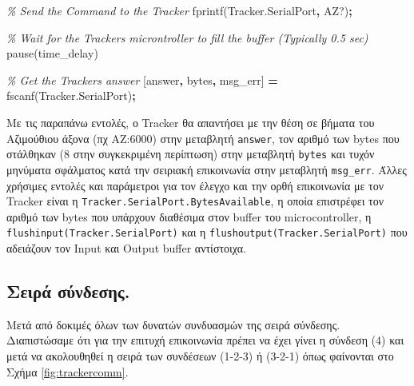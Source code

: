 \documentclass[
  a4paper,
  twoside,
  titlepage,
  12pt]{article}
\newenvironment{Shaded}{\begin{snugshade}}{\end{snugshade}}
\newcommand{\CommentTok}[1]{\textcolor[rgb]{0.56,0.35,0.01}{\textit{#1}}}
\newcommand{\NormalTok}[1]{#1}
\newcommand{\OperatorTok}[1]{\textcolor[rgb]{0.81,0.36,0.00}{\textbf{#1}}}
\newcommand{\SpecialStringTok}[1]{\textcolor[rgb]{0.31,0.60,0.02}{#1}}
\newcommand{\VariableTok}[1]{\textcolor[rgb]{0.00,0.00,0.00}{#1}}
\numberwithin{equation}{section}
\numberwithin{figure}{section}
\numberwithin{table}{section}
\begin{document}
\begin{Shaded}
\begin{Highlighting}[]
\CommentTok{\% Send the Command to the Tracker}
\VariableTok{fprintf}\NormalTok{(}\VariableTok{Tracker}\NormalTok{.}\VariableTok{SerialPort}\OperatorTok{,} \SpecialStringTok{\textquotesingle{}AZ?\textquotesingle{}}\NormalTok{)}\OperatorTok{;}
\end{Highlighting}
\end{Shaded}

\begin{Shaded}
\begin{Highlighting}[]
\CommentTok{\% Wait for the Tracker\textquotesingle{}s microntroller to fill the buffer (Typically 0.5 sec)}
\VariableTok{pause}\NormalTok{(}\VariableTok{time\_delay}\NormalTok{)}
\end{Highlighting}
\end{Shaded}

\begin{Shaded}
\begin{Highlighting}[]
\CommentTok{\% Get the Tracker\textquotesingle{}s answer}
\NormalTok{[}\VariableTok{answer}\OperatorTok{,} \VariableTok{bytes}\OperatorTok{,} \VariableTok{msg\_err}\NormalTok{] }\OperatorTok{=} \VariableTok{fscanf}\NormalTok{(}\VariableTok{Tracker}\NormalTok{.}\VariableTok{SerialPort}\NormalTok{)}\OperatorTok{;}
\end{Highlighting}
\end{Shaded}

Με τις παραπάνω εντολές, ο Tracker θα απαντήσει με την θέση σε βήματα του Αζιμούθιου άξονα (πχ AZ:6000) στην μεταβλητή \texttt{answer}, τον αριθμό των bytes που στάλθηκαν (8 στην συγκεκριμένη περίπτωση) στην μεταβλητή \texttt{bytes} και τυχόν μηνύματα σφάλματος κατά την σειριακή επικοινωνία στην μεταβλητή \texttt{msg\_err}. Άλλες χρήσιμες εντολές και παράμετροι για τον έλεγχο και την ορθή επικοινωνία με τον Tracker είναι η \texttt{Tracker.SerialPort.BytesAvailable}, η οποία επιστρέφει τον αριθμό των bytes που υπάρχουν διαθέσιμα στον buffer του microcontroller, η \texttt{flushinput(Tracker.SerialPort)} και η \texttt{flushoutput(Tracker.SerialPort)} που αδειάζουν τον Input και Output buffer αντίστοιχα.

\hypertarget{tracker_connection}{%
\subsection{Σειρά σύνδεσης.}\label{tracker_connection}}

Μετά από δοκιμές όλων των δυνατών συνδυασμών της σειρά σύνδεσης. Διαπιστώσαμε ότι για την επιτυχή επικοινωνία πρέπει να έχει γίνει η σύνδεση (4) και μετά να ακολουθηθεί η σειρά των συνδέσεων (1-2-3) ή (3-2-1) όπως φαίνονται στο Σχήμα \ref{fig:trackercomm}.
\end{document}
